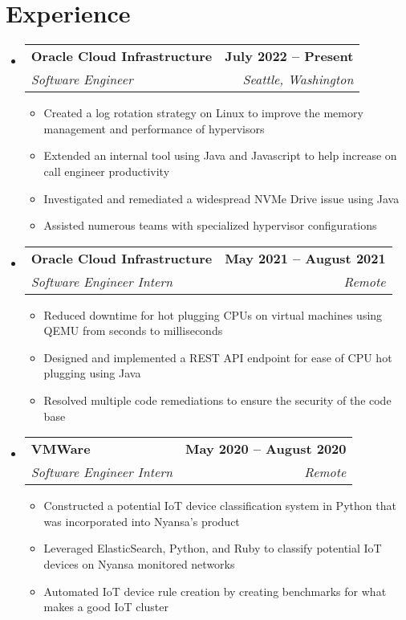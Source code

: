 \documentclass[letterpaper,11pt]{article}
\makeatletter
\newcommand{\resumeItem}[1]{
  \item\small{
    {#1 \vspace{-2pt}}
  }
}
\newcommand{\resumeSubheading}[4]{
  \vspace{-2pt}\item
    \begin{tabular*}{1.0\textwidth}[t]{l@{\extracolsep{\fill}}r}
      \textbf{#1} & \textbf{\small #2} \\
      \textit{\small#3} & \textit{\small #4} \\
    \end{tabular*}\vspace{-7pt}
}
\newcommand{\resumeSubHeadingListStart}{\begin{itemize}[leftmargin=0.0in, label={}]}
\newcommand{\resumeSubHeadingListEnd}{\end{itemize}}
\newcommand{\resumeItemListStart}{\begin{itemize}}
\newcommand{\resumeItemListEnd}{\end{itemize}\vspace{-5pt}}
\makeatother
\begin{document}
\section{Experience}
  \resumeSubHeadingListStart

    \resumeSubheading
      {Oracle Cloud Infrastructure}{July 2022 -- Present}
      {Software Engineer}{Seattle, Washington}
      \resumeItemListStart
        \resumeItem{Created a log rotation strategy on Linux to improve the memory management and performance of hypervisors}
        \resumeItem{Extended an internal tool using Java and Javascript to help increase on call engineer productivity}
        \resumeItem{Investigated and remediated a widespread NVMe Drive issue using Java}
        \resumeItem{Assisted numerous teams with specialized hypervisor configurations}
      \resumeItemListEnd

    \resumeSubheading
      {Oracle Cloud Infrastructure}{May 2021 -- August 2021}
      {Software Engineer Intern}{Remote}
      \resumeItemListStart
        \resumeItem{Reduced downtime for hot plugging CPUs on virtual machines using QEMU from seconds to milliseconds}
        \resumeItem{Designed and implemented  a REST API endpoint for ease of CPU hot plugging using Java}
        \resumeItem{Resolved multiple code remediations to ensure the security of the code base}
    \resumeItemListEnd

    \resumeSubheading
      {VMWare}{May 2020 -- August 2020}
      {Software Engineer Intern}{Remote}
      \resumeItemListStart
        \resumeItem{Constructed a potential IoT device classification system in Python that was incorporated into Nyansa’s product}
        \resumeItem{Leveraged ElasticSearch, Python, and Ruby to classify potential IoT devices on Nyansa monitored networks}
        \resumeItem{Automated IoT device rule creation by creating benchmarks for what makes a good IoT cluster}
    \resumeItemListEnd
    
  \resumeSubHeadingListEnd
\vspace{-16pt}

\end{document}
